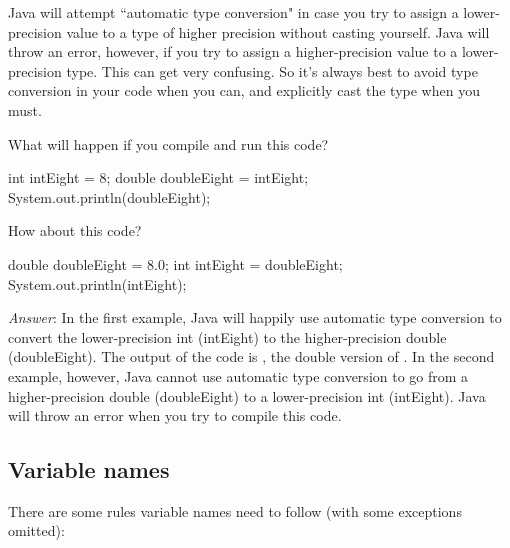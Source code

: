 Java will attempt ``automatic type conversion" in case you try to assign a lower-precision value to a type of higher precision without casting yourself. Java will throw an error, however, if you try to assign a higher-precision value to a lower-precision type. This can get very confusing. So it's always best to avoid type conversion in your code when you can, and explicitly cast the type when you must. 

\begin{exercise}
  What will happen if you compile and run this code? 
  \begin{code}
    int intEight = 8;
   double doubleEight = intEight;
   System.out.println(doubleEight);
  \end{code}
  
  How about this code? 
  \begin{code}
  double doubleEight = 8.0;
  int intEight = doubleEight; 
  System.out.println(intEight);
  \end{code}
  
\noindent \emph{Answer}: In the first example, Java will happily use automatic type conversion to convert the lower-precision int (intEight) to the higher-precision double (doubleEight). The output of the code is , the double version of . In the second example, however, Java cannot use automatic type conversion to go from a higher-precision double (doubleEight) to a lower-precision int (intEight). Java will throw an error when you try to compile this code. 
\end{exercise}

\subsection{Variable names}

There are some rules variable names need to follow (with some exceptions omitted):

